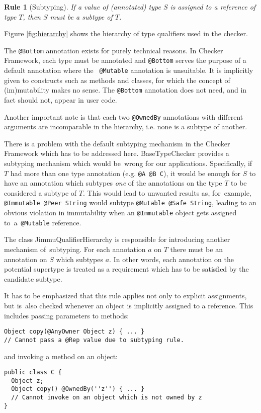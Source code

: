 \documentclass{pracamgr}
\theoremstyle{break}
\theoremstyle{break}
\theoremstyle{break}
\newtheorem{verrule}{Rule}
\begin{document}
\setcounter{verrule}{-1}
\begin{verrule}[Subtyping]
  If a value of (annotated) type $S$ is assigned to a reference of type $T$, 
  then $S$ must be a subtype of $T$.
\end{verrule}
Figure \ref{fig:hierarchy} shows the hierarchy of type qualifiers used
in the checker. 

The \texttt{@Bottom} annotation exists for purely technical
reasons. In Checker Framework, each type must be annotated and
\texttt{@Bottom} serves the purpose of a default annotation where the~
\texttt{@Mutable} annotation is unsuitable. It is implicitly given to
constructs such as methods and classes, for which the concept of
(im)mutability makes no sense. The \texttt{@Bottom} annotation does
not need, and in fact should not, appear in user code.

Another important note is that each two \texttt{@OwnedBy} annotations
with different arguments are incomparable in the hierarchy, i.e. none
is a subtype of another.

There is a problem with the default subtyping mechanism in the Checker
Framework which has to be addressed here. BaseTypeChecker provides a
subtyping mechanism which would be~wrong for our
applications. Specifically, if $T$ had more than one type annotation
(e.g. \texttt{@A @B C}), it would be enough for $S$ to have an
annotation which subtypes \emph{one} of the annotations on the type
$T$ to be considered a subtype of $T$. This would lead to unwanted
results as, for~example, \texttt{@Immutable @Peer String} would
subtype \texttt{@Mutable @Safe String}, leading to an obvious
violation in immutability when an \texttt{@Immutable} object gets
assigned to~a~\texttt{@Mutable} reference.

The class JimmuQualifierHierarchy is responsible for introducing
another mechanism of~subtyping. For each annotation $a$ on $T$ there
must be an annotation on $S$ which subtypes $a$. In other words, each
annotation on the potential supertype is treated as a requirement
which has to be satisfied by the candidate subtype. 

It has to be emphasized that this rule applies not only to explicit
assignments, but is~also checked whenever an object is implicitly
assigned to a reference. This includes passing parameters to methods:
\begin{lstlisting}
Object copy(@AnyOwner Object z) { ... } 
// Cannot pass a @Rep value due to subtyping rule.
\end{lstlisting}
and invoking a method on an object: 
\begin{lstlisting}
public class C {
  Object z;
  Object copy() @OwnedBy(''z'') { ... } 
  // Cannot invoke on an object which is not owned by z
}
\end{lstlisting}
\end{document}
